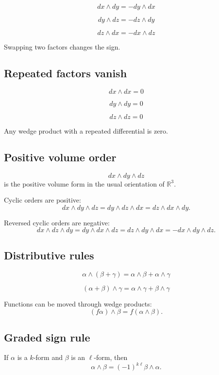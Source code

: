\[
\boxed{
    dx\wedge dy=-dy\wedge dx
}
\]

\[
\boxed{
    dy\wedge dz=-dz\wedge dy
}
\]

\[
\boxed{
    dz\wedge dx=-dx\wedge dz
}
\]

Swapping two factors changes the sign.

\subsection*{Repeated factors vanish}

\[
\boxed{
    dx\wedge dx=0
}
\]

\[
\boxed{
    dy\wedge dy=0
}
\]

\[
\boxed{
    dz\wedge dz=0
}
\]

Any wedge product with a repeated differential is zero.

\subsection*{Positive volume order}

\[
\boxed{
    dx\wedge dy\wedge dz
}
\]
is the positive volume form in the usual orientation of \(\mathbb R^3\).

Cyclic orders are positive:
\[
\boxed{
    dx\wedge dy\wedge dz
    =
    dy\wedge dz\wedge dx
    =
    dz\wedge dx\wedge dy.
}
\]

Reversed cyclic orders are negative:
\[
\boxed{
    dx\wedge dz\wedge dy
    =
    dy\wedge dx\wedge dz
    =
    dz\wedge dy\wedge dx
    =
    -dx\wedge dy\wedge dz.
}
\]

\subsection*{Distributive rules}

\[
\boxed{
    \alpha\wedge(\beta+\gamma)
    =
    \alpha\wedge\beta+\alpha\wedge\gamma
}
\]

\[
\boxed{
    (\alpha+\beta)\wedge\gamma
    =
    \alpha\wedge\gamma+\beta\wedge\gamma
}
\]

Functions can be moved through wedge products:
\[
\boxed{
    (f\alpha)\wedge\beta
    =
    f(\alpha\wedge\beta).
}
\]

\subsection*{Graded sign rule}

If \(\alpha\) is a \(k\)-form and \(\beta\) is an \(\ell\)-form, then
\[
\boxed{
    \alpha\wedge\beta
    =
    (-1)^{k\ell}\beta\wedge\alpha.
}
\]

